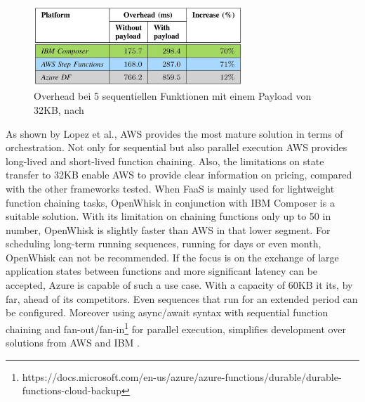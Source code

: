 \documentclass[11pt]{article}
\begin{document}
\begin{figure}[H]
\caption{Overhead bei 5 sequentiellen Funktionen mit einem Payload von 32KB, nach \cite{lopez2018comparison}}
\label{fig:orchestration}
\centering
\includegraphics[width=0.7\textwidth]{Orchestration}
\end{figure} 
As shown by Lopez et al., AWS provides the most mature solution in terms of orchestration. Not only for sequential but also parallel execution AWS provides long-lived and short-lived function chaining. Also, the limitations on state transfer to 32KB enable AWS to provide clear information on pricing, compared with the other frameworks tested. When FaaS is mainly used for lightweight function chaining tasks, OpenWhisk in conjunction with IBM Composer is a suitable solution. With its limitation on chaining functions only up to 50 in number, OpenWhisk is slightly faster than AWS in that lower segment. For scheduling long-term running sequences, running for days or even month, OpenWhisk can not be recommended. If the focus is on the exchange of large application states between functions and more significant latency can be accepted, Azure is capable of such a use case. With a capacity of 60KB it its, by far, ahead of its competitors. Even sequences that run for an extended period can be configured. Moreover using async/await syntax with sequential function chaining and fan-out/fan-in\footnote{https://docs.microsoft.com/en-us/azure/azure-functions/durable/durable-functions-cloud-backup} for parallel execution, simplifies development over solutions from AWS and IBM \cite{lopez2018comparison}.
\end{document}
